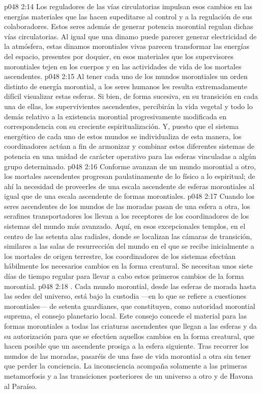 \vs p048 2:14 Los reguladores de las vías circulatorias impulsan esos cambios en las energías materiales que las hacen supeditarse al control y a la regulación de sus colaboradores. Estos seres además de generar potencia morontial regulan dichas vías circulatorias. Al igual que una dinamo puede parecer generar electricidad de la atmósfera, estas dinamos morontiales vivas parecen transformar las energías del espacio, presentes por doquier, en esos materiales que los supervisores morontiales tejen en los cuerpos y en las actividades de vida de los mortales ascendentes.
\vs p048 2:15  Al tener cada uno de los mundos morontiales un orden distinto de energía morontial, a los seres humanos les resulta extremadamente difícil visualizar estas esferas. Si bien, de forma sucesiva, en su transición en cada una de ellas, los supervivientes ascendentes, percibirán la vida vegetal y todo lo demás relativo a la existencia morontial progresivamente modificada en correspondencia con su creciente espiritualización. Y, puesto que el sistema energético de cada uno de estos mundos se individualiza de esta manera, los coordinadores actúan a fin de armonizar y combinar estos diferentes sistemas de potencia en una unidad de carácter operativo para las esferas vinculadas a algún grupo determinado.
\vs p048 2:16 Conforme avanzan de un mundo morontial a otro, los mortales ascendentes progresan paulatinamente de lo físico a lo espiritual; de ahí la necesidad de proveerles de una escala ascendente de esferas morontiales al igual que de una escala ascendente de formas morontiales.
\vs p048 2:17 Cuando los seres ascendentes de los mundos de las moradas pasan de una esfera a otra, los serafines transportadores los llevan a los receptores de los coordinadores de los sistemas del mundo más avanzado. Aquí, en esos excepcionales templos, en el centro de las setenta alas radiales, donde se localizan las cámaras de transición, similares a las salas de resurrección del mundo en el que se recibe inicialmente a los mortales de origen terrestre, los coordinadores de los sistemas efectúan hábilmente los necesarios cambios en la forma creatural. Se necesitan unos siete días de tiempo regular para llevar a cabo estos primeros cambios de la forma morontial.
\vs p048 2:18 . Cada mundo morontial, desde las esferas de morada hasta las sedes del universo, está bajo la custodia ---en lo que se refiere a cuestiones morontiales--- de setenta guardianes, que constituyen, como autoridad morontial suprema, el consejo planetario local. Este consejo concede el material para las formas morontiales a todas las criaturas ascendentes que llegan a las esferas y da su autorización para que se efectúen aquellos cambios en la forma creatural, que hacen posible que un ascendente prosiga a la esfera siguiente. Tras recorrer los mundos de las moradas, pasaréis de una fase de vida morontial a otra sin tener que perder la conciencia. La inconsciencia acompaña solamente a las primeras metamorfosis y a las transiciones posteriores de un universo a otro y de Havona al Paraíso.
